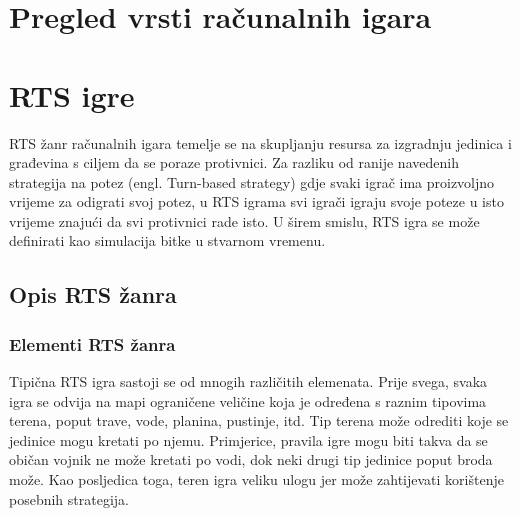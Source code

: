\documentclass[times, utf8, zavrsni, numeric]{fer}
\begin{document}

\chapter{Pregled vrsti računalnih igara}\label{ch:games}

\chapter{RTS igre}\label{ch:rtsGames}
RTS žanr računalnih igara temelje se na skupljanju resursa za izgradnju jedinica i građevina s ciljem da se poraze protivnici. 
Za razliku od ranije navedenih strategija na potez (engl. Turn-based strategy) gdje svaki igrač ima proizvoljno vrijeme za odigrati svoj potez, u RTS igrama svi igrači igraju svoje poteze u isto vrijeme znajući da svi protivnici rade isto. 
U širem smislu, RTS igra se može definirati kao simulacija bitke u stvarnom vremenu\cite{url:WhatDoesRTSMean}.


\section{Opis RTS žanra}


\subsection{Elementi RTS žanra}

\par Tipična RTS igra sastoji se od mnogih različitih elemenata.
Prije svega, svaka igra se odvija na mapi ograničene veličine koja je određena s raznim tipovima terena, poput trave, vode, planina, pustinje, itd. 
Tip terena može odrediti koje se jedinice mogu kretati po njemu.
Primjerice, pravila igre mogu biti takva da se običan vojnik ne može kretati po vodi, dok neki drugi tip jedinice poput broda može. 
Kao posljedica toga, teren igra veliku ulogu jer može zahtijevati korištenje posebnih strategija.
\end{document}
